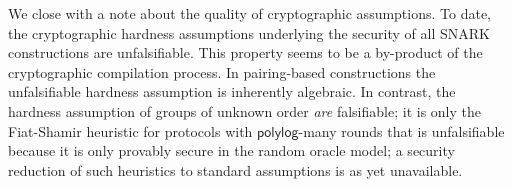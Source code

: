 We close with a note about the quality of cryptographic assumptions. To date, the cryptographic hardness assumptions underlying the security of all SNARK constructions are unfalsifiable. This property seems to be a by-product of the cryptographic compilation process. In pairing-based constructions the unfalsifiable hardness assumption is inherently algebraic. In contrast, the hardness assumption of groups of unknown order \emph{are} falsifiable; it is only the Fiat-Shamir heuristic for protocols with $\mathsf{polylog}$-many rounds that is unfalsifiable because it is only provably secure in the random oracle model; a security reduction of such heuristics to standard assumptions is as yet unavailable.